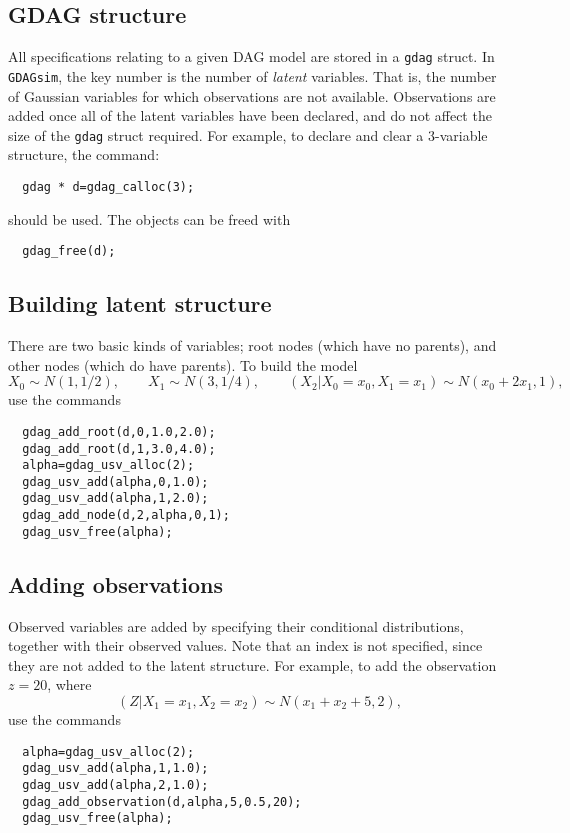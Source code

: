 \documentclass[12pt,a4paper]{article}
\newcommand{\gds}{\texttt{GDAGsim}}
\begin{document}
\subsection{GDAG structure}

All specifications relating to a given DAG model are stored in a
\texttt{gdag} struct. In \gds, the key number is the number of
\emph{latent} variables. That is, the number of Gaussian variables for 
which observations are not available. Observations are added once all
of the latent variables have been declared, and do not affect the size 
of the \texttt{gdag} struct required. For example, to declare and
clear a 3-variable structure, the command:
\begin{verbatim}
  gdag * d=gdag_calloc(3);
\end{verbatim}
should be used. The objects can be freed with
\begin{verbatim}
  gdag_free(d);
\end{verbatim}

\subsection{Building latent structure}

There are two basic kinds of variables; root nodes (which have no
parents), and other nodes (which do have parents). To build the model
\[
X_0 \sim N(1,1/2),\qquad X_1 \sim N(3,1/4),\qquad  (X_2|X_0=x_0,X_1=x_1) \sim 
N(x_0+2x_1,1),
\]
use the commands
\begin{verbatim}
  gdag_add_root(d,0,1.0,2.0);
  gdag_add_root(d,1,3.0,4.0); 
  alpha=gdag_usv_alloc(2);
  gdag_usv_add(alpha,0,1.0);
  gdag_usv_add(alpha,1,2.0);
  gdag_add_node(d,2,alpha,0,1);
  gdag_usv_free(alpha);
\end{verbatim}

\subsection{Adding observations}

Observed variables are added by specifying their conditional
distributions, together with their observed values. Note that an index 
is not specified, since they are not added to the latent structure.
For example, to add the observation $z=20$, where
\[
(Z|X_1=x_1,X_2=x_2) \sim N(x_1+x_2+5,2),
\]
use the commands
\begin{verbatim}
  alpha=gdag_usv_alloc(2);
  gdag_usv_add(alpha,1,1.0);
  gdag_usv_add(alpha,2,1.0);
  gdag_add_observation(d,alpha,5,0.5,20);
  gdag_usv_free(alpha);
\end{verbatim}
\end{document}
